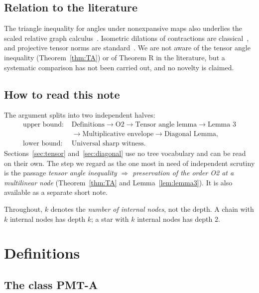 \documentclass[11pt]{amsart}
\theoremstyle{definition}
\newcommand{\PMTA}{\textsf{PMT-A}}
\begin{document}
\subsection*{Relation to the literature}
The triangle inequality for angles under nonexpansive maps also underlies the scaled
relative graph calculus~\cite{RHY}. Isometric dilations of contractions are
classical~\cite{NF}, and projective tensor norms are standard~\cite{Ryan}. We are not
aware of the tensor angle inequality (Theorem~\ref{thm:TA}) or of Theorem R in the
literature, but a systematic comparison has not been carried out, and no novelty is
claimed.

\subsection*{How to read this note}

The argument splits into two independent halves:
\begin{align*}
\text{upper bound: }&\text{Definitions}\to\text{O2}\to\text{Tensor angle lemma}\to\text{Lemma 3}\\
&\to\text{Multiplicative envelope}\to\text{Diagonal Lemma},\\
\text{lower bound: }&\text{Universal sharp witness}.
\end{align*}
Sections~\ref{sec:tensor} and~\ref{sec:diagonal} use no tree vocabulary and can be
read on their own. The step we regard as the one most in need of independent
scrutiny is the passage \emph{tensor angle inequality $\Rightarrow$ preservation
of the order O2 at a multilinear node} (Theorem~\ref{thm:TA} and
Lemma~\ref{lem:lemma3}). It is also available as a separate short note.

Throughout, $k$ denotes the \emph{number of internal nodes}, not the depth. A chain
with $k$ internal nodes has depth $k$; a star with $k$ internal nodes has depth $2$.

\section{Definitions}\label{sec:defs}

\subsection{The class \PMTA}
\end{document}
